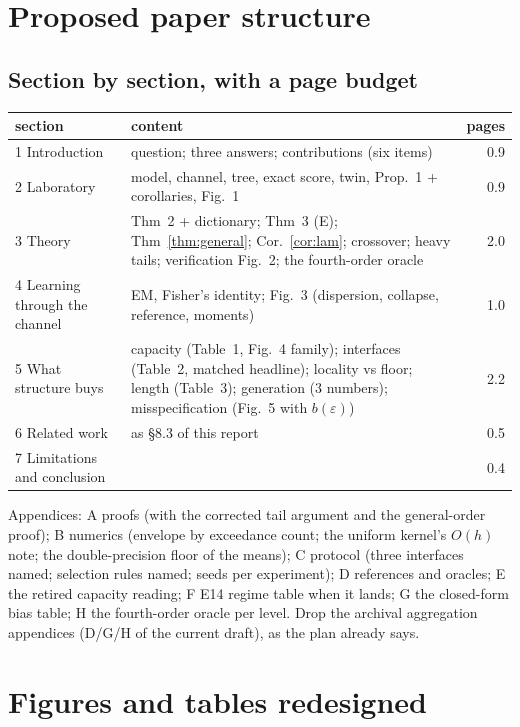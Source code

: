 \section{Proposed paper structure}
\label{sec:structure}
\subsection{Section by section, with a page budget}

\begin{tabular}{@{}lp{9.0cm}r@{}}
\toprule
section & content & pages \\
\midrule
1 Introduction & question; three answers; contributions (six items) & 0.9 \\
2 Laboratory & model, channel, tree, exact score, twin, Prop.~1 + corollaries, Fig.~1 & 0.9 \\
3 Theory & Thm~2 + dictionary; Thm~3 (E); Thm~\ref{thm:general}; Cor.~\ref{cor:lam}; crossover; heavy tails; verification Fig.~2; the fourth-order oracle & 2.0 \\
4 Learning through the channel & EM, Fisher's identity; Fig.~3 (dispersion, collapse, reference, moments) & 1.0 \\
5 What structure buys & capacity (Table~1, Fig.~4 family); interfaces (Table~2, matched headline); locality vs floor; length (Table~3); generation (3 numbers); misspecification (Fig.~5 with $b(\varepsilon)$) & 2.2 \\
6 Related work & as \S8.3 of this report & 0.5 \\
7 Limitations and conclusion & & 0.4 \\
\bottomrule
\end{tabular}

\noindent Appendices: A proofs (with the corrected tail argument and the general-order proof); B numerics (envelope by exceedance count; the uniform kernel's $O(h)$ note; the double-precision floor of the means); C protocol (three interfaces named; selection rules named; seeds per experiment); D references and oracles; E the retired capacity reading; F E14 regime table when it lands; G the closed-form bias table; H the fourth-order oracle per level. Drop the archival aggregation appendices (D/G/H of the current draft), as the plan already says.

\section{Figures and tables redesigned}
\label{sec:figures}


